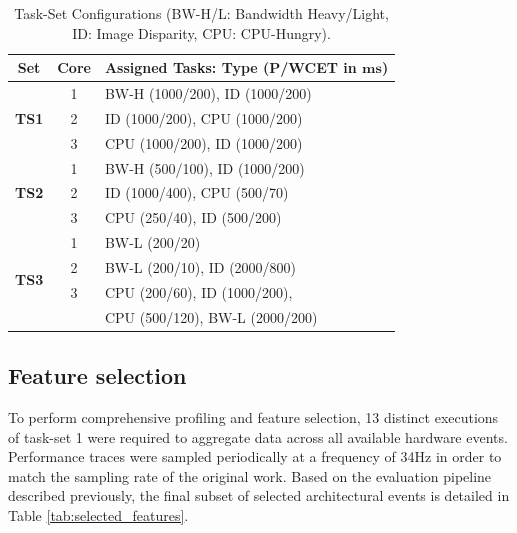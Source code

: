 \documentclass[journal]{IEEEtran}
\begin{document}
\begin{table}[htb]
    \caption{Task-Set Configurations (BW-H/L: Bandwidth Heavy/Light, ID: Image Disparity, CPU: CPU-Hungry).}
    \label{tab:task-sets}
    \centering
    \footnotesize 
    \begin{tabular}{|c|c|l|}
        \hline
        \textbf{Set} & \textbf{Core} & \textbf{Assigned Tasks: Type (P/WCET in $\mathbf{ms}$)} \\ \hline
        \multirow{3}{*}{\textbf{TS1}}
         & 1 & BW-H (1000/200), ID (1000/200) \\
         & 2 & ID (1000/200), CPU (1000/200) \\
         & 3 & CPU (1000/200), ID (1000/200) \\ \hline
        \multirow{3}{*}{\textbf{TS2}}
         & 1 & BW-H (500/100), ID (1000/200) \\
         & 2 & ID (1000/400), CPU (500/70) \\
         & 3 & CPU (250/40), ID (500/200) \\ \hline
        \multirow{4}{*}{\textbf{TS3}}
         & 1 & BW-L (200/20) \\
         & 2 & BW-L (200/10), ID (2000/800) \\
         & 3 & CPU (200/60), ID (1000/200), \\ 
         &   & CPU (500/120), BW-L (2000/200) \\ \hline
    \end{tabular}
\end{table}

\subsection{Feature selection}

To perform comprehensive profiling and feature selection, 13 distinct executions of task-set 1 were required to aggregate data across all available hardware events. Performance traces were sampled periodically at a frequency of 34Hz in order to match the sampling rate of the original work. Based on the evaluation pipeline described previously, the final subset of selected architectural events is detailed in Table \ref{tab:selected_features}.
\end{document}
